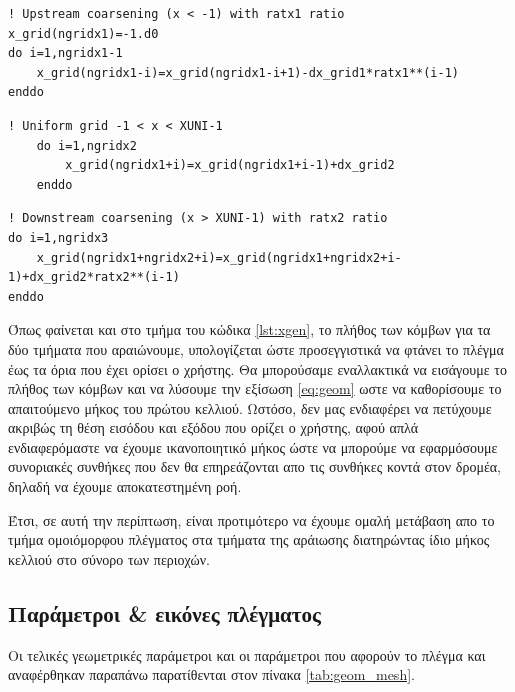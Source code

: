 \begin{lstlisting}[caption=\textrm{Αραίωση πλέγματος ανάντι δρομέα}, label={lst:xup}, mathescape=true, breaklines=true, linewidth=.6\textwidth]
! Upstream coarsening (x < -1) with ratx1 ratio
x_grid(ngridx1)=-1.d0
do i=1,ngridx1-1
    x_grid(ngridx1-i)=x_grid(ngridx1-i+1)-dx_grid1*ratx1**(i-1)
enddo
\end{lstlisting}

\begin{lstlisting}[caption=\textrm{Ομοιόμορφο πλέγμα κοντά στον δρομέα}, label={lst:xuni}, mathescape=true, breaklines=true, linewidth=.6\textwidth]
    ! Uniform grid -1 < x < XUNI-1
    do i=1,ngridx2
        x_grid(ngridx1+i)=x_grid(ngridx1+i-1)+dx_grid2
    enddo
\end{lstlisting}

\begin{lstlisting}[caption=\textrm{Αραίωση πλέγματος κατάντι δρομέα}, label={lst:xdown}, mathescape=true, breaklines=true, linewidth=.6\textwidth]
! Downstream coarsening (x > XUNI-1) with ratx2 ratio 
do i=1,ngridx3
    x_grid(ngridx1+ngridx2+i)=x_grid(ngridx1+ngridx2+i-1)+dx_grid2*ratx2**(i-1)
enddo
\end{lstlisting}
Όπως φαίνεται και στο τμήμα του κώδικα \ref{lst:xgen}, το πλήθος των κόμβων για τα δύο τμήματα που αραιώνουμε, υπολογίζεται ώστε προσεγγιστικά να φτάνει το πλέγμα έως τα όρια που έχει ορίσει ο χρήστης. Θα μπορούσαμε εναλλακτικά να εισάγουμε το πλήθος των κόμβων και να λύσουμε την εξίσωση \ref{eq:geom} ωστε να καθορίσουμε το απαιτούμενο μήκος του πρώτου κελλιού. Ωστόσο, δεν μας ενδιαφέρει να πετύχουμε ακριβώς τη θέση εισόδου και εξόδου που ορίζει ο χρήστης, αφού απλά ενδιαφερόμαστε να έχουμε ικανοποιητικό μήκος ώστε να μπορούμε να εφαρμόσουμε συνοριακές συνθήκες που δεν θα επηρεάζονται απο τις συνθήκες κοντά στον δρομέα, δηλαδή να έχουμε αποκατεστημένη ροή.

Έτσι, σε αυτή την περίπτωση, είναι προτιμότερο να έχουμε ομαλή μετάβαση απο το τμήμα ομοιόμορφου πλέγματος στα τμήματα της αράιωσης διατηρώντας ίδιο μήκος κελλιού στο σύνορο των περιοχών.

\subsection{Παράμετροι \& εικόνες πλέγματος}

Οι τελικές γεωμετρικές παράμετροι και οι παράμετροι που αφορούν το πλέγμα και αναφέρθηκαν παραπάνω παρατίθενται στον πίνακα \ref{tab:geom_mesh}.


